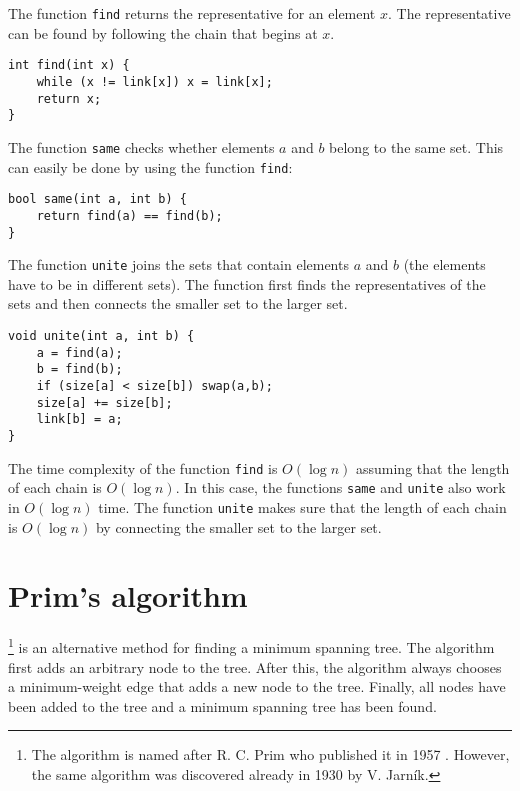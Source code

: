 The function \texttt{find} returns
the representative for an element $x$.
The representative can be found by following
the chain that begins at $x$.

\begin{lstlisting}
int find(int x) {
    while (x != link[x]) x = link[x];
    return x;
}
\end{lstlisting}

The function \texttt{same} checks
whether elements $a$ and $b$ belong to the same set.
This can easily be done by using the
function \texttt{find}:

\begin{lstlisting}
bool same(int a, int b) {
    return find(a) == find(b);
}
\end{lstlisting}

\begin{samepage}
The function \texttt{unite} joins the sets
that contain elements $a$ and $b$
(the elements have to be in different sets).
The function first finds the representatives
of the sets and then connects the smaller
set to the larger set.

\begin{lstlisting}
void unite(int a, int b) {
    a = find(a);
    b = find(b);
    if (size[a] < size[b]) swap(a,b);
    size[a] += size[b];
    link[b] = a;
}
\end{lstlisting}
\end{samepage}

The time complexity of the function \texttt{find}
is $O(\log n)$ assuming that the length of each
chain is $O(\log n)$.
In this case, the functions \texttt{same} and \texttt{unite}
also work in $O(\log n)$ time.
The function \texttt{unite} makes sure that the
length of each chain is $O(\log n)$ by connecting
the smaller set to the larger set.

\section{Prim's algorithm}


\footnote{The algorithm is
named after R. C. Prim who published it in 1957 \cite{pri57}.
However, the same algorithm was discovered already in 1930
by V. Jarník.} is an alternative method
for finding a minimum spanning tree.
The algorithm first adds an arbitrary node
to the tree.
After this, the algorithm always chooses
a minimum-weight edge that
adds a new node to the tree.
Finally, all nodes have been added to the tree
and a minimum spanning tree has been found.


